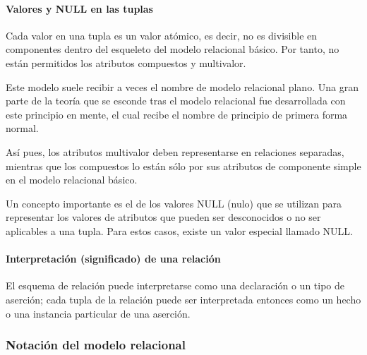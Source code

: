 \paragraph{Valores y NULL en las tuplas}


Cada valor en una tupla es un valor atómico, es decir, no es divisible en componentes dentro del esqueleto del modelo relacional básico. Por tanto, no están permitidos los atributos compuestos y multivalor.


Este modelo suele recibir a veces el nombre de modelo relacional plano. Una gran parte de la teoría que se esconde tras el modelo relacional fue desarrollada con este principio en mente, el cual recibe el nombre de principio de primera forma normal.


Así pues, los atributos multivalor deben representarse en relaciones separadas, mientras que los compuestos lo están sólo por sus atributos de componente simple en el modelo relacional básico.


Un concepto importante es el de los valores NULL (nulo) que se utilizan para representar los valores de atributos que pueden ser desconocidos o no ser aplicables a una tupla. Para estos casos, existe un valor especial llamado NULL. 


\paragraph{Interpretación (significado) de una relación}


El esquema de relación puede interpretarse como una declaración o un tipo de aserción; cada tupla de la relación puede ser interpretada entonces como un hecho o una instancia particular de una aserción.


\subsubsection{Notación del modelo relacional}

